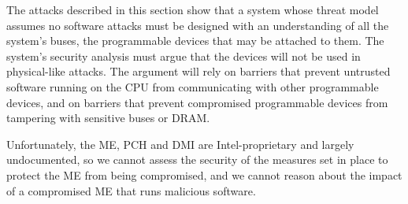 The attacks described in this section show that a system whose threat model
assumes no software attacks must be designed with an understanding of all the
system's buses, the programmable devices that may be attached to them. The
system's security analysis must argue that the devices will not be used in
physical-like attacks. The argument will rely on barriers that prevent
untrusted software running on the CPU from communicating with other
programmable devices, and on barriers that prevent compromised programmable
devices from tampering with sensitive buses or DRAM.

Unfortunately, the ME, PCH and DMI are Intel-proprietary and largely
undocumented, so we cannot assess the security of the measures set in place to
protect the ME from being compromised, and we cannot reason about the impact
of a compromised ME that runs malicious software.
